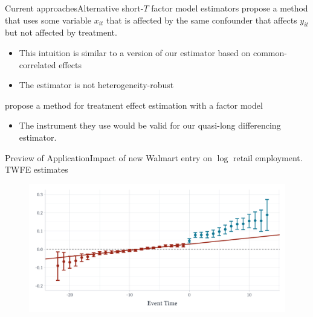 \documentclass[aspectratio=169,t,11pt]{beamer}
\begin{document}
\begin{frame}{Current approaches}{Alternative short-$T$ factor model estimators}
   propose a method that uses some variable $x_{it}$ that is affected by the same confounder that affects $y_{it}$ but not affected by treatment.
  \begin{itemize}
    \item This intuition is similar to a version of our estimator based on common-correlated effects 
    \item The estimator is not heterogeneity-robust
  \end{itemize}

  \bigskip
   propose a method for treatment effect estimation with a factor model
  \begin{itemize}
    \item The instrument they use would be valid for our quasi-long differencing estimator.
  \end{itemize}
\end{frame}

\begin{frame}{Preview of Application}{Impact of new Walmart entry on $\log$ retail employment. TWFE estimates}
  \vspace{-5mm}
  \begin{figure}
    \begin{adjustbox}{width=0.9\textwidth}
      \includegraphics{../figures/did2s_retail.pdf}
    \end{adjustbox}
  \end{figure}
\end{frame}
\end{document}
